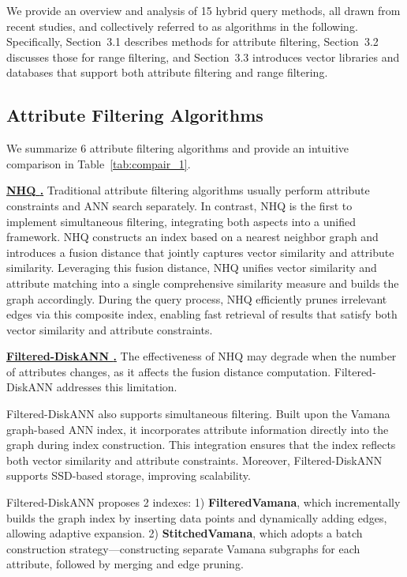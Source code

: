 \documentclass[sigconf, nonacm]{acmart}
\begin{document}
	
	We provide an overview and analysis of 15 hybrid query methods, all drawn from recent studies, and collectively referred to as algorithms in the following. Specifically, Section~3.1 describes methods for attribute filtering, Section~3.2 discusses those for range filtering, and Section~3.3 introduces vector libraries and databases that support both attribute filtering and range filtering.
	
	
	\subsection{Attribute Filtering Algorithms}
	
	We summarize 6 attribute filtering algorithms and provide an intuitive comparison in Table~\ref{tab:compair_1}.
	
	\noindent\textbf{\underline{NHQ \cite{NHQ}.}}  
	Traditional attribute filtering algorithms usually perform attribute constraints and ANN search separately. In contrast, NHQ is the first to implement simultaneous filtering, integrating both aspects into a unified framework. NHQ constructs an index based on a nearest neighbor graph and introduces a fusion distance that jointly captures vector similarity and attribute similarity. Leveraging this fusion distance, NHQ unifies vector similarity and attribute matching into a single comprehensive similarity measure and builds the graph accordingly. During the query process, NHQ efficiently prunes irrelevant edges via this composite index, enabling fast retrieval of results that satisfy both vector similarity and attribute constraints.
	
	
	\noindent\textbf{\underline{Filtered-DiskANN \cite{Filtered-diskann}.}}  
	The effectiveness of NHQ may degrade when the number of attributes changes, as it affects the fusion distance computation. Filtered-DiskANN addresses this limitation.
	
	Filtered-DiskANN also supports simultaneous filtering. Built upon the Vamana \cite{diskann} graph-based ANN index, it incorporates attribute information directly into the graph during index construction. This integration ensures that the index reflects both vector similarity and attribute constraints. Moreover, Filtered-DiskANN supports SSD-based storage, improving scalability.
	
	Filtered-DiskANN proposes 2 indexes:  
	1) \textbf{FilteredVamana}, which incrementally builds the graph index by inserting data points and dynamically adding edges, allowing adaptive expansion.  
	2) \textbf{StitchedVamana}, which adopts a batch construction strategy—constructing separate Vamana subgraphs for each attribute, followed by merging and edge pruning.
	
\end{document}
